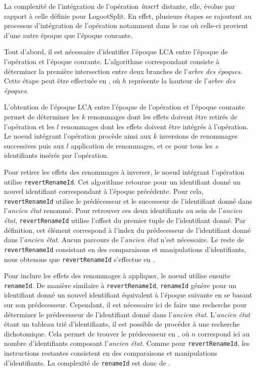 La complexité de l'intégration de l'opération $\mathit{insert}$ distante, elle, évolue par rapport à celle définie pour LogootSplit.
En effet, plusieurs étapes se rajoutent au processus d'intégration de l'opération notamment dans le cas où celle-ci provient d'une autre époque que l'époque courante.

Tout d'abord, il est nécessaire d'identifier l'époque \ac{LCA} entre l'époque de l'opération et l'époque courante.
L'algorithme correspondant consiste à déterminer la première intersection entre deux branches de l'\emph{arbre des époques}.
Cette étape peut être effectuée en , où $h$ représente la hauteur de l'\emph{arbre des époques}.

L'obtention de l'époque \ac{LCA} entre l'époque de l'opération et l'époque courante permet de déterminer les $k$ renommages dont les effets doivent être retirés de l'opération et les $l$ renommages dont les effets doivent être intégrés à l'opération.
Le noeud intégrant l'opération procède ainsi aux $k$ inversions de renommages successives puis aux $l$ application de renommages, et ce pour tous les $s$ identifiants insérés par l'opération.

Pour retirer les effets des renommages à inverser, le noeud intégrant l'opération utilise \texttt{revertRenameId}.
Cet algorithme retourne pour un identifiant donné un nouvel identifiant correspondant à l'époque précédente.
Pour cela, \texttt{revertRenameId} utilise le prédécesseur et le successeur de l'identifiant donné dans l'\emph{ancien état} renommé.
Pour retrouver ces deux identifiants au sein de l'\emph{ancien état}, \texttt{revertRenameId} utilise l'offset du premier tuple de l'identifiant donné.
Par définition, cet élément correspond à l'index du prédecesseur de l'identifiant donné dans l'\emph{ancien état}.
Aucun parcours de l'\emph{ancien état} n'est nécessaire.
Le reste de \texttt{revertRenameId} consistant en des comparaisons et manipulations d'identifiants, nous obtenons que \texttt{revertRenameId} s'effectue en .

Pour inclure les effets des renommages à appliquer, le noeud utilise ensuite \texttt{renameId}.
De manière similaire à \texttt{revertRenameId}, \texttt{renameId} génère pour un identifiant donné un nouvel identifiant équivalent à l'époque suivante en se basant sur son prédecesseur.
Cependant, il est nécessaire ici de faire une recherche pour déterminer le prédecesseur de l'identifiant donné dans l'\emph{ancien état}.
L'\emph{ancien état} étant un tableau trié d'identifiants, il est possible de procéder à une recherche dichotomique.
Cela permet de trouver le prédecesseur en , où $n$ correspond ici au nombre d'identifiants composant l'\emph{ancien état}.
Comme pour \texttt{revertRenameId}, les instructions restantes consistent en des comparaisons et manipulations d'identifiants.
La complexité de \texttt{renameId} est donc de .

